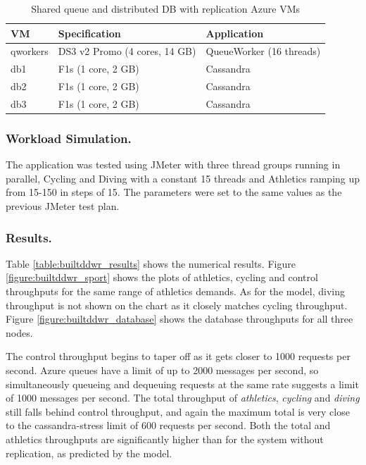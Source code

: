 \documentclass[runningheads]{llncs}
\begin{document}
\begin{table}[h!]
	\centering
	\caption{Shared queue and distributed DB with replication Azure VMs}
	\label{table:builtddwr_vmdesign}
	\begin{tabular}{l | l | l}
		VM		& Specification			& Application \\
		\hline
		qworkers	& DS3 v2 Promo (4 cores, 14 GB)	& QueueWorker (16 threads) \\
		db1		& F1s (1 core, 2 GB)		& Cassandra \\
		db2		& F1s (1 core, 2 GB)		& Cassandra \\
		db3		& F1s (1 core, 2 GB)		& Cassandra \\
	\end{tabular}
\end{table}

\subsubsection{Workload Simulation.}  The application was tested using JMeter with three thread groups running in parallel, Cycling and Diving with a constant 15 threads and Athletics ramping up from 15-150 in steps of 15.  The parameters were set to the same values as the previous JMeter test plan.

\subsubsection{Results.} 
Table \ref{table:builtddwr_results} shows the numerical results. Figure \ref{figure:builtddwr_sport} shows the plots of athletics, cycling and control throughputs for the same range of athletics demands.  As for the model, diving throughput is not shown on the chart as it closely matches cycling throughput.  Figure \ref{figure:builtddwr_database} shows the database throughputs for all three nodes.

The control throughput begins to taper off as it gets closer to 1000 requests per second.  Azure queues have a limit of up to 2000 messages per second, so simultaneously queueing and dequeuing requests at the same rate suggests a limit of 1000 messages per second.  The total throughput of {\itshape athletics}, {\itshape cycling} and {\itshape diving} still falls behind control throughput, and again the maximum total is very close to the cassandra-stress limit of 600 requests per second.  Both the total and athletics throughputs are significantly higher than for the system without replication, as predicted by the model.
\end{document}
